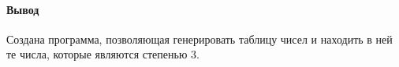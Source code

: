 \paragraph{Вывод}
Создана программа, позволяющая генерировать таблицу чисел и находить в ней те числа, которые являются степенью 3.